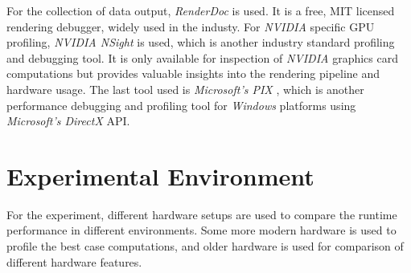 \noindent
For the collection of data output, \emph{RenderDoc} \cite{RenderDoc} is used. It is a free, MIT licensed 
rendering debugger, widely used in the industy. For \emph{NVIDIA} specific \ac{GPU} profiling, \emph{NVIDIA NSight} 
\cite{NSight} is used, which is another industry standard profiling and debugging tool. It is only available for 
inspection of \emph{NVIDIA} graphics card computations but provides valuable insights into the rendering pipeline 
and hardware usage. The last tool used is \emph{Microsoft's PIX} \cite{PIX}, which is another performance debugging 
and profiling tool for \emph{Windows} platforms using \emph{Microsoft's DirectX} \ac{API}.


\section{Experimental Environment} \label{sec-experimental-environment}

For the experiment, different hardware setups are used to compare the runtime performance in different environments.
Some more modern hardware is used to profile the best case computations, and older hardware is used for comparison of 
different hardware features. 

